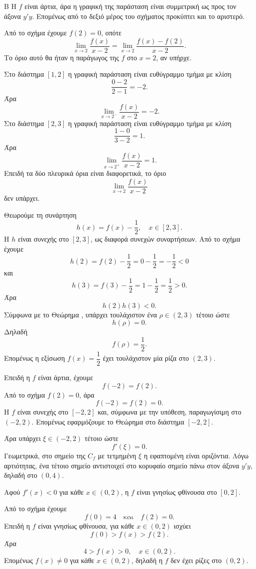 

\begin{thema}{Β}
Η $f$ είναι άρτια, άρα η γραφική της παράσταση είναι συμμετρική ως προς τον άξονα $y'y$. Επομένως από το δεξιό μέρος του σχήματος προκύπτει και το αριστερό.

\begin{erwthma}
\item Από το σχήμα έχουμε $f(2)=0$, οπότε
\[
\lim_{x\to 2}\frac{f(x)}{x-2}
=\lim_{x\to 2}\frac{f(x)-f(2)}{x-2}.
\]
Το όριο αυτό θα ήταν η παράγωγος της $f$ στο $x=2$, αν υπήρχε.

Στο διάστημα $[1,2]$ η γραφική παράσταση είναι ευθύγραμμο τμήμα με κλίση
\[
\frac{0-2}{2-1}=-2.
\]
Άρα
\[
\lim_{x\to 2^-}\frac{f(x)}{x-2}=-2.
\]
Στο διάστημα $[2,3]$ η γραφική παράσταση είναι ευθύγραμμο τμήμα με κλίση
\[
\frac{1-0}{3-2}=1.
\]
Άρα
\[
\lim_{x\to 2^+}\frac{f(x)}{x-2}=1.
\]
Επειδή τα δύο πλευρικά όρια είναι διαφορετικά, το όριο
\[
\lim_{x\to 2}\frac{f(x)}{x-2}
\]
δεν υπάρχει.

\item Θεωρούμε τη συνάρτηση
\[
h(x)=f(x)-\frac{1}{2},\quad x\in[2,3].
\]
Η $h$ είναι συνεχής στο $[2,3]$, ως διαφορά συνεχών συναρτήσεων. Από το σχήμα έχουμε
\[
h(2)=f(2)-\frac{1}{2}=0-\frac{1}{2}=-\frac{1}{2}<0
\]
και
\[
h(3)=f(3)-\frac{1}{2}=1-\frac{1}{2}=\frac{1}{2}>0.
\]
Άρα
\[
h(2)h(3)<0.
\]
Σύμφωνα με το Θεώρημα , υπάρχει τουλάχιστον ένα $\rho\in(2,3)$ τέτοιο ώστε
\[
h(\rho)=0.
\]
Δηλαδή
\[
f(\rho)=\frac{1}{2}.
\]
Επομένως η εξίσωση $f(x)=\dfrac{1}{2}$ έχει τουλάχιστον μία ρίζα στο $(2,3)$.

\item Επειδή η $f$ είναι άρτια, έχουμε
\[
f(-2)=f(2).
\]
Από το σχήμα $f(2)=0$, άρα
\[
f(-2)=f(2)=0.
\]
Η $f$ είναι συνεχής στο $[-2,2]$ και, σύμφωνα με την υπόθεση, παραγωγίσιμη στο $(-2,2)$. Επομένως εφαρμόζουμε το Θεώρημα  στο διάστημα $[-2,2]$.

Άρα υπάρχει $\xi\in(-2,2)$ τέτοιο ώστε
\[
f'(\xi)=0.
\]
Γεωμετρικά, στο σημείο της $C_f$ με τετμημένη $\xi$ η εφαπτομένη είναι οριζόντια. Λόγω αρτιότητας, ένα τέτοιο σημείο αντιστοιχεί στο κορυφαίο σημείο πάνω στον άξονα $y'y$, δηλαδή στο $(0,4)$.

\item Αφού $f'(x)<0$ για κάθε $x\in(0,2)$, η $f$ είναι γνησίως φθίνουσα στο $[0,2]$.

Από το σχήμα έχουμε
\[
f(0)=4
\quad\text{και}\quad
f(2)=0.
\]
Επειδή η $f$ είναι γνησίως φθίνουσα, για κάθε $x\in(0,2)$ ισχύει
\[
f(0)>f(x)>f(2).
\]
Άρα
\[
4>f(x)>0,\quad x\in(0,2).
\]
Επομένως $f(x)\neq 0$ για κάθε $x\in(0,2)$, δηλαδή η $f$ δεν έχει ρίζες στο $(0,2)$.
\end{erwthma}
\end{thema}

